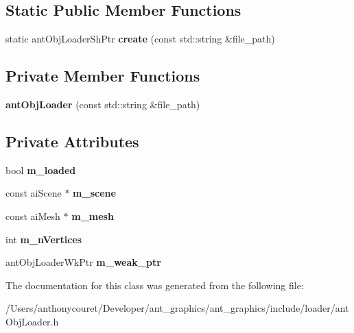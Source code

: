 \subsection*{Static Public Member Functions}
\begin{DoxyCompactItemize}
\item 
\hypertarget{classant_obj_loader_a92320806fcb86a263ba9b8d18bf981a3}{static ant\+Obj\+Loader\+Sh\+Ptr {\bfseries create} (const std\+::string \&file\+\_\+path)}\label{classant_obj_loader_a92320806fcb86a263ba9b8d18bf981a3}

\end{DoxyCompactItemize}
\subsection*{Private Member Functions}
\begin{DoxyCompactItemize}
\item 
\hypertarget{classant_obj_loader_a24d0e1dcd6069e7c13a822b1c42f980b}{{\bfseries ant\+Obj\+Loader} (const std\+::string \&file\+\_\+path)}\label{classant_obj_loader_a24d0e1dcd6069e7c13a822b1c42f980b}

\end{DoxyCompactItemize}
\subsection*{Private Attributes}
\begin{DoxyCompactItemize}
\item 
\hypertarget{classant_obj_loader_a346b1aff15e82516b09702a8eed63fa2}{bool {\bfseries m\+\_\+loaded}}\label{classant_obj_loader_a346b1aff15e82516b09702a8eed63fa2}

\item 
\hypertarget{classant_obj_loader_ab415218f6df9eb35bf15668f8d461644}{const ai\+Scene $\ast$ {\bfseries m\+\_\+scene}}\label{classant_obj_loader_ab415218f6df9eb35bf15668f8d461644}

\item 
\hypertarget{classant_obj_loader_ac98e373d38608b64a5bcce904b3e0451}{const ai\+Mesh $\ast$ {\bfseries m\+\_\+mesh}}\label{classant_obj_loader_ac98e373d38608b64a5bcce904b3e0451}

\item 
\hypertarget{classant_obj_loader_a57832a9c805c0efd9a307147ed00ae8c}{int {\bfseries m\+\_\+n\+Vertices}}\label{classant_obj_loader_a57832a9c805c0efd9a307147ed00ae8c}

\item 
\hypertarget{classant_obj_loader_aba3b7466d22a4b247e5635cdc27c49d8}{ant\+Obj\+Loader\+Wk\+Ptr {\bfseries m\+\_\+weak\+\_\+ptr}}\label{classant_obj_loader_aba3b7466d22a4b247e5635cdc27c49d8}

\end{DoxyCompactItemize}


The documentation for this class was generated from the following file\+:\begin{DoxyCompactItemize}
\item 
/\+Users/anthonycouret/\+Developer/ant\+\_\+graphics/ant\+\_\+graphics/include/loader/ant\+Obj\+Loader.\+h\end{DoxyCompactItemize}
